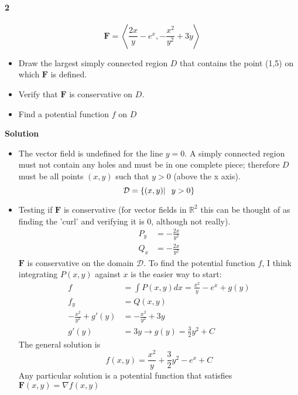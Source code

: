\documentclass{article}
\begin{document}
    \paragraph{2}
    \[\mathbf{F} = \left\langle \frac{2x}{y}-e^{x}, -\frac{x^2}{y^2}+3y\right\rangle \]
    \begin{itemize}
        \item Draw the largest simply connected region $D$ that contains the point (1,5) on which $\mathbf{F}$ is defined.
        \item Verify that $\mathbf{F}$ is conservative on $D$.
        \item Find a potential function $f$ on $D$
    \end{itemize}
    \textbf{Solution}
    \begin{itemize}
        \item The vector field is undefined for the line $y=0$.
        A simply connected region must not contain any holes and must be in one complete piece;
        therefore $D$ must be all points $(x,y)$ such that $y > 0$ (above the x axis).
        \[\mathcal{D} =  \{(x,y)|\hspace{0.1in} y > 0\}\]
        \item Testing if $\mathbf{F}$ is conservative (for vector fields in $\mathbb{R}^2$ this can be thought of as finding
        the 'curl' and verifying it is 0, although not really).
        \begin{align*}
            P_y &= -\frac{2x}{y^2}\\
            Q_x &= -\frac{2x}{y^2}
        \end{align*}
        $\mathbf{F}$ is conservative on the domain $\mathcal{D}$. To find the potential function $f$, I think integrating $P(x,y)$
        against $x$ is the easier way to start:
        \begin{align*}
            f &= \int P(x,y) dx = \frac{x^2}{y} -e^x + g(y)\\
            f_y &= Q(x,y)\\
            -\frac{x^2}{y^2} +g'(y) &= -\frac{x^2}{y^2}+3y\\
            g'(y) &= 3y \rightarrow g(y) = \frac{3}{2}y^2 + C
        \end{align*}
        The general solution is
        \[f(x,y) = \frac{x^2}{y}+\frac{3}{2}y^2 -e^{x} + C\]
        Any particular solution is a potential function that satisfies $\mathbf{F}(x,y) = \nabla f(x,y)$
    \end{itemize}
\end{document}
